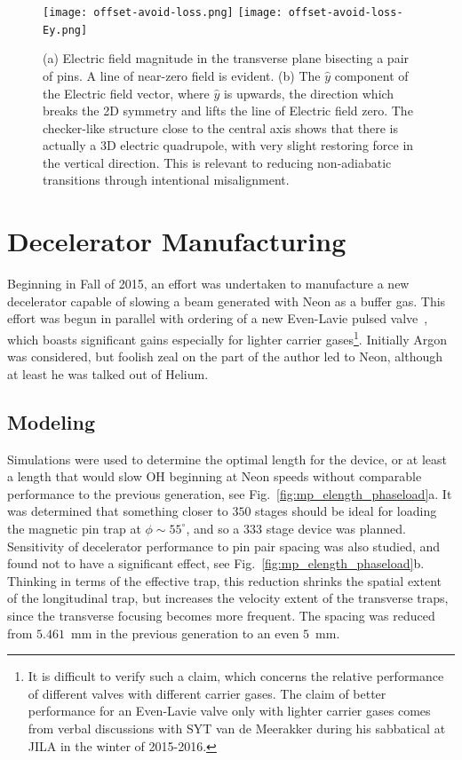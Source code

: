 \begin{figure}[t!]
\centering
\texttt{[image: offset-avoid-loss.png]}
\texttt{[image: offset-avoid-loss-Ey.png]}
\caption[Fields Close to Zeros of SF Mode]{\label{offsetavoid}
(a) Electric field magnitude in the transverse plane bisecting a pair of pins. A line of near-zero field is evident.
(b) The $\hat{y}$ component of the Electric field vector, where $\hat{y}$ is upwards, the direction which breaks the 2D symmetry and lifts the line of Electric field zero. The checker-like structure close to the central axis shows that there is actually a 3D electric quadrupole, with very slight restoring force in the vertical direction. This is relevant to reducing non-adiabatic transitions through intentional misalignment.
}
\end{figure}



\section{Decelerator Manufacturing}

Beginning in Fall of 2015, an effort was undertaken to manufacture a new decelerator capable of slowing a beam generated with Neon as a buffer gas. 
This effort was begun in parallel with ordering of a new Even-Lavie pulsed valve~\cite{Even2015}, which boasts significant gains especially for lighter carrier gases\footnote{It is difficult to verify such a claim, which concerns the relative performance of different valves with different carrier gases. The claim of better performance for an Even-Lavie valve only with lighter carrier gases comes from verbal discussions with SYT van de Meerakker during his sabbatical at JILA in the winter of 2015-2016.}.
Initially Argon was considered, but foolish zeal on the part of the author led to Neon, although at least he was talked out of Helium.

\subsection{Modeling}

Simulations were used to determine the optimal length for the device, or at least a length that would slow OH beginning at Neon speeds without comparable performance to the previous generation, see Fig.~\ref{fig:mp_elength_phaseload}a.
It was determined that something closer to $350$ stages should be ideal for loading the magnetic pin trap at $\phi\sim 55^\circ$, and so a $333$ stage device was planned.
Sensitivity of decelerator performance to pin pair spacing was also studied, and found not to have a significant effect, see Fig.~\ref{fig:mp_elength_phaseload}b.
Thinking in terms of the effective trap, this reduction shrinks the spatial extent of the longitudinal trap, but increases the velocity extent of the transverse traps, since the transverse focusing becomes more frequent.
The spacing was reduced from $5.461$~mm in the previous generation to an even $5$~mm.

